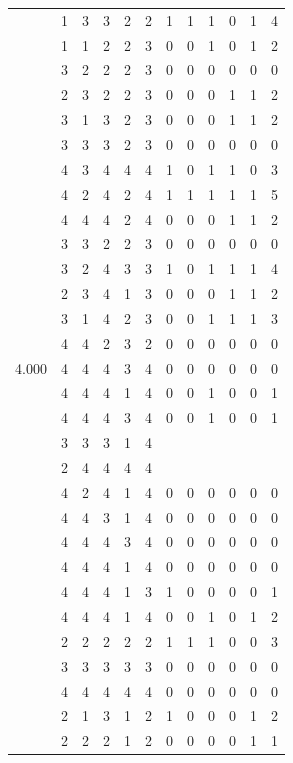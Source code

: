 \documentclass[]{book}
\theoremstyle{definition}
\theoremstyle{definition}
\theoremstyle{definition}
\theoremstyle{remark}
\begin{document}
\begin{table}
{\begin{tabular}[t]{rrrrrrrrrrrr}
 & 1 & 3 & 3 & 2 & 2 & 1 & 1 & 1 & 0 & 1 & 4\\
 & 1 & 1 & 2 & 2 & 3 & 0 & 0 & 1 & 0 & 1 & 2\\
 & 3 & 2 & 2 & 2 & 3 & 0 & 0 & 0 & 0 & 0 & 0\\
 & 2 & 3 & 2 & 2 & 3 & 0 & 0 & 0 & 1 & 1 & 2\\
 & 3 & 1 & 3 & 2 & 3 & 0 & 0 & 0 & 1 & 1 & 2\\
 & 3 & 3 & 3 & 2 & 3 & 0 & 0 & 0 & 0 & 0 & 0\\
 & 4 & 3 & 4 & 4 & 4 & 1 & 0 & 1 & 1 & 0 & 3\\
 & 4 & 2 & 4 & 2 & 4 & 1 & 1 & 1 & 1 & 1 & 5\\
 & 4 & 4 & 4 & 2 & 4 & 0 & 0 & 0 & 1 & 1 & 2\\
 & 3 & 3 & 2 & 2 & 3 & 0 & 0 & 0 & 0 & 0 & 0\\
 & 3 & 2 & 4 & 3 & 3 & 1 & 0 & 1 & 1 & 1 & 4\\
 & 2 & 3 & 4 & 1 & 3 & 0 & 0 & 0 & 1 & 1 & 2\\
 & 3 & 1 & 4 & 2 & 3 & 0 & 0 & 1 & 1 & 1 & 3\\
 & 4 & 4 & 2 & 3 & 2 & 0 & 0 & 0 & 0 & 0 & 0\\
4.000 & 4 & 4 & 4 & 3 & 4 & 0 & 0 & 0 & 0 & 0 & 0\\
 & 4 & 4 & 4 & 1 & 4 & 0 & 0 & 1 & 0 & 0 & 1\\
 & 4 & 4 & 4 & 3 & 4 & 0 & 0 & 1 & 0 & 0 & 1\\
 & 3 & 3 & 3 & 1 & 4 &  &  &  &  &  & \\
 & 2 & 4 & 4 & 4 & 4 &  &  &  &  &  & \\
 & 4 & 2 & 4 & 1 & 4 & 0 & 0 & 0 & 0 & 0 & 0\\
 & 4 & 4 & 3 & 1 & 4 & 0 & 0 & 0 & 0 & 0 & 0\\
 & 4 & 4 & 4 & 3 & 4 & 0 & 0 & 0 & 0 & 0 & 0\\
 & 4 & 4 & 4 & 1 & 4 & 0 & 0 & 0 & 0 & 0 & 0\\
 & 4 & 4 & 4 & 1 & 3 & 1 & 0 & 0 & 0 & 0 & 1\\
 & 4 & 4 & 4 & 1 & 4 & 0 & 0 & 1 & 0 & 1 & 2\\
 & 2 & 2 & 2 & 2 & 2 & 1 & 1 & 1 & 0 & 0 & 3\\
 & 3 & 3 & 3 & 3 & 3 & 0 & 0 & 0 & 0 & 0 & 0\\
 & 4 & 4 & 4 & 4 & 4 & 0 & 0 & 0 & 0 & 0 & 0\\
 & 2 & 1 & 3 & 1 & 2 & 1 & 0 & 0 & 0 & 1 & 2\\
 & 2 & 2 & 2 & 1 & 2 & 0 & 0 & 0 & 0 & 1 & 1\\

\end{tabular}}
\end{table}
\end{document}
